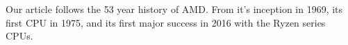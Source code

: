 \documentclass[../computer-history.tex]{subfiles}
\begin{document}
Our article follows the 53 year history of AMD. From it's inception in 1969, its first CPU in 1975, and its first major success in 2016 with the Ryzen series CPUs.
\biblio
\end{document}
